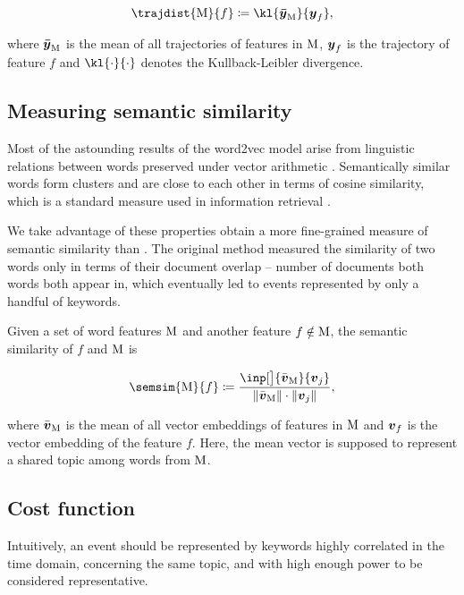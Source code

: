 \begin{equation}
	\trajdist{\featset}{f} \coloneqq \kl{\vect{\bar{\traj}}_{\featset}}{\vect{\traj}_{f}},
\end{equation}

where $\vect{\bar{\traj}}_{\featset}$ is the mean of all trajectories of features in $\text{M}$, $\vect{\traj}_{f}$ is the trajectory of feature $f$ and $\kl{\cdot}{\cdot}$ denotes the Kullback-Leibler divergence.


\subsection{Measuring semantic similarity}
Most of the astounding results of the word2vec model arise from linguistic relations between words preserved under vector arithmetic \cite{linguistic-regularities}. Semantically similar words form clusters and are close to each other in terms of cosine similarity, which is a standard measure used in information retrieval \cite{information-retrieval, cosine-similarity}.

We take advantage of these properties obtain a more fine-grained measure of semantic similarity than \cite{event-detection}. The original method measured the similarity of two words only in terms of their document overlap -- number of documents both words both appear in, which eventually led to events represented by only a handful of keywords.

Given a set of word features $\text{M}$ and another feature $f \notin \text{M}$, the semantic similarity of $f$ and $\text{M}$ is

\begin{equation}
	\semsim{\featset}{f} \coloneqq \frac{\inp[\big]{\bar{\embed}_{\featset}}{\embed_{j}}}{\| \bar{\embed}_{\featset} \| \cdot \| \embed_{j} \|},
\end{equation}

where $\bar{\embed}_{\featset}$ is the mean of all vector embeddings of features in $\text{M}$ and $\embed_{f}$ is the vector embedding of the feature $f$. Here, the mean vector is supposed to represent a shared topic among words from $\text{M}$.


\subsection{Cost function}
Intuitively, an event should be represented by keywords highly correlated in the time domain, concerning the same topic, and with high enough power to be considered representative.


